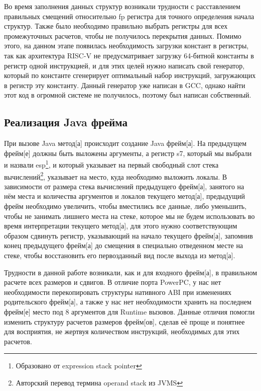  
Во время заполнения данных структур возникали трудности с расставлением правильных смещений относительно fp регистра для точного определения начала структур. Также было необходимо правильно выбрать регистры для всех промежуточных расчетов, чтобы не получилось перекрытия данных. Помимо этого, на данном этапе появилась необходимость загрузки констант в регистры, так как архитектура RISC-V не предусматривает загрузку 64-битной константы в регистр одной инструкцией, и для этих целей нужно написать свой генератор, который по константе сгенерирует оптимальный набор инструкций, загружающих в регистр эту константу. Данный генератор уже написан в GCC, однако найти этот код в огромной системе не получилось, поэтому был написан собственный.





\subsection{Реализация Java фрейма}
При вызове Java \gls{метод}[а] происходит создание Java \gls{фрейм}[а]. На предыдущем \gls{фрейм}[е] должны быть выложены аргументы, а регистр s7, который мы выбрали и назвали esp\footnote{Образовано от expression stack pointer}, и который указывает на первый свободный слот стека вычислений\footnote{Авторский перевод термина operand stack из JVMS}, указывает на место, куда необходимо выложить локалы. В зависимости от размера стека вычислений предыдущего \gls{фрейм}[а], занятого на нём места и количества аргументов и локалов текущего \gls{метод}[а], предыдущий \gls{фрейм} необходимо увеличить, чтобы вместились все данные, либо уменьшить, чтобы не занимать лишнего места на стеке, которое мы не будем использовать во время интерпретации текущего \gls{метод}[а], для этого нужно соответствующим образом сдвинуть регистр, указывающий на начало текущего \gls{фрейм}[а], запомнив конец предыдущего \gls{фрейм}[а] до смещения в специально отведенном месте на стеке, чтобы восстановить его первозданный вид после выхода из \gls{метод}[а].

Трудности в данной работе возникали, как и для входного \gls{фрейм}[а], в правильном расчете всех размеров и сдвигов. В отличие порта PowerPC, у нас нет необходимости перекопировать структуры нативного ABI при изменениях родительского \gls{фрейм}[а], а также у нас нет необходимости хранить на последнем \gls{фрейм}[е] место под 8 аргументов для Runtime вызовов. Данные отличия помогли изменить структуру расчетов размеров \gls{фрейм}[ов], сделав её проще и понятнее для восприятия, не жертвуя количеством инструкций, необходимых для этих расчетов.

